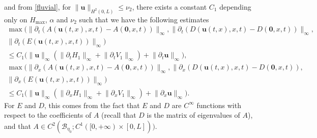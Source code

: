 \documentclass[11pt]{article}
\numberwithin{equation}{section}
\let\mathcal\mathscr
\theoremstyle{definition}
\begin{document}
and from \eqref{fluvial},
for $\lVert\boldsymbol{u}\rVert_{H^{2}(0,L)}\leq \nu_{2}$, there exists a constant $C_{1}$ depending only on $H_{\max}$, $\alpha$ and $\nu_{2}$ such that we have the following estimates
\begin{equation}
\label{ineq}
\begin{split}
\max\bigl(\lVert \partial_{t}(A(\boldsymbol{u}(t,x),x,t)-A(\boldsymbol{0},x,t))\rVert_{\infty},\lVert \partial_{t}(D(\boldsymbol{u}(t,x),x,t)-D(\boldsymbol{0},x,t))\rVert_{\infty},&\\
\lVert \partial_{t}(E(\boldsymbol{u}(t,x),x,t))\rVert_{\infty}\bigr)&\\
\leq C_{1}\bigl(\lVert\boldsymbol{u}\rVert_{\infty}(\lVert\partial_{t}H_{1}\rVert_{\infty}+\lVert\partial_{t}V_{1}\rVert_{\infty})+\lVert\partial_{t}\boldsymbol{u}\rVert_{\infty}\bigr),&\\
\max\bigl(\lVert \partial_{{x}}(A(\boldsymbol{u}(t,x),x,t)-A(\boldsymbol{0},x,t))\rVert_{\infty},\lVert \partial_{{x}}(D(\boldsymbol{u}(t,x),x,t)-D(\boldsymbol{0},x,t)),&\\
\lVert \partial_{{x}}(E(\boldsymbol{u}(t,x),x,t))\rVert_{\infty}\bigr)&\\
\leq C_{1} \bigl(\lVert\boldsymbol{u}\rVert_{\infty}(\lVert\partial_{x}H_{1}\rVert_{\infty}+\lVert\partial_{x}V_{1}\rVert_{\infty})+\lVert\partial_{x}\boldsymbol{u}\rVert_{\infty} \bigr).&
\end{split}
\end{equation}
For $E$ and $D$, this comes from the fact that $E$ and $D$ are $C^{\infty}$ functions with respect to the coefficients of $A$ ({recall} that $D$ is the matrix of eigenvalues of $A$), and that $A\in C^{2}(\mathcal{B}_{\eta_{0}}; C^{1}([0,+\infty)\times[0,L]))$.
\end{document}
